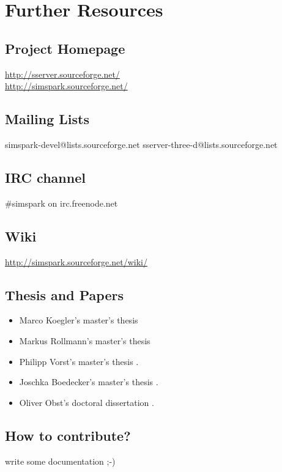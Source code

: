 \chapter{Further Resources}


\section{Project Homepage}

\url{http://sserver.sourceforge.net/}\\
\url{http://simspark.sourceforge.net/}

\section{Mailing Lists}

simspark-devel@lists.sourceforge.net
sserver-three-d@lists.sourceforge.net

\section{IRC channel}

\#simspark on irc.freenode.net

\section{Wiki}

\url{http://simspark.sourceforge.net/wiki/}

\section{Thesis and Papers}

\begin{itemize}
\item Marco Koegler's master's thesis \cite{Koegler03}
\item Markus Rollmann's master's thesis \cite{Rollmann04}
\item Philipp Vorst's master's thesis \cite{Vorst06}.
\item Joschka Boedecker's master's thesis \cite{Boedecker06}.
\item Oliver Obst's doctoral dissertation \cite{Obst07}.
\end{itemize}

\section{How to contribute?}

write some documentation ;-)

